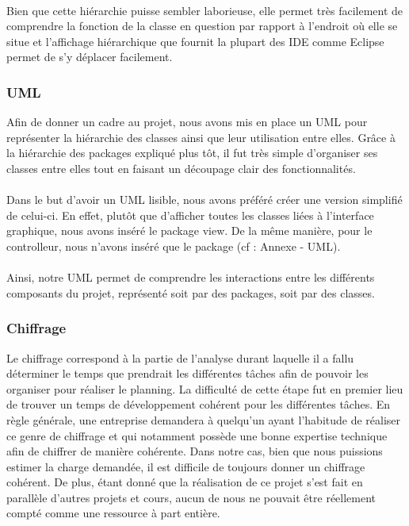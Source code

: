 \documentclass[a4paper,11pt]{article}
\begin{document}
\paragraph{} Bien que cette hiérarchie puisse sembler laborieuse, elle permet très facilement de comprendre la fonction de la classe en question par rapport à l'endroit où elle se situe et l'affichage hiérarchique que fournit la plupart des IDE comme Eclipse permet de s'y déplacer facilement.

\subsubsection{UML}
Afin de donner un cadre au projet, nous avons mis en place un UML pour représenter la hiérarchie des classes ainsi que leur utilisation entre elles. Grâce à la hiérarchie des packages expliqué plus tôt, il fut très simple d'organiser ses classes entre elles tout en faisant un découpage clair des fonctionnalités. 

\paragraph{} Dans le but d'avoir un UML lisible, nous avons préféré créer une version simplifié de celui-ci. En effet, plutôt que d'afficher toutes les classes liées à l'interface graphique, nous avons inséré le package view. De la même manière, pour le controlleur, nous n'avons inséré que le package (cf : Annexe - UML).

\paragraph{} Ainsi, notre UML permet de comprendre les interactions entre les différents composants du projet, représenté soit par des packages, soit par des classes.

\subsubsection{Chiffrage}
Le chiffrage correspond à la partie de l'analyse durant laquelle il a fallu déterminer le temps que prendrait les différentes tâches afin de pouvoir les organiser pour réaliser le planning. La difficulté de cette étape fut en premier lieu de trouver un temps de développement cohérent pour les différentes tâches. En règle générale, une entreprise demandera à quelqu'un ayant l'habitude de réaliser ce genre de chiffrage et qui notamment possède une bonne expertise technique afin de chiffrer de manière cohérente. Dans notre cas, bien que nous puissions estimer la charge demandée, il est difficile de toujours donner un chiffrage cohérent. De plus, étant donné que la réalisation de ce projet s'est fait en parallèle d'autres projets et cours, aucun de nous ne pouvait être réellement compt\'e comme une ressource à part entière.
\end{document}
